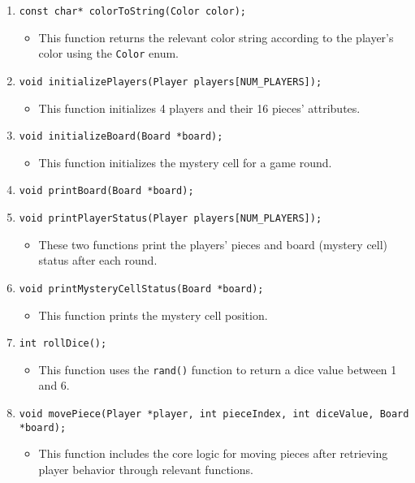 \documentclass[a4paper,12pt]{article}
\begin{document}
\begin{enumerate}
    \item \texttt{const char* colorToString(Color color);}
    \begin{itemize}
        \item This function returns the relevant color string according to the player’s color using the \texttt{Color} enum.
    \end{itemize}

    \item \texttt{void initializePlayers(Player players[NUM\_PLAYERS]);}
    \begin{itemize}
        \item This function initializes 4 players and their 16 pieces' attributes.
    \end{itemize}

    \item \texttt{void initializeBoard(Board *board);}
    \begin{itemize}
        \item This function initializes the mystery cell for a game round.
    \end{itemize}

    \item \texttt{void printBoard(Board *board);}
    \item \texttt{void printPlayerStatus(Player players[NUM\_PLAYERS]);}
    \begin{itemize}
        \item These two functions print the players’ pieces and board (mystery cell) status after each round.
    \end{itemize}

    \item \texttt{void printMysteryCellStatus(Board *board);}
    \begin{itemize}
        \item This function prints the mystery cell position.
    \end{itemize}

    \item \texttt{int rollDice();}
    \begin{itemize}
        \item This function uses the \texttt{rand()} function to return a dice value between 1 and 6.
    \end{itemize}

    \item \texttt{void movePiece(Player *player, int pieceIndex, int diceValue, Board *board);}
    \begin{itemize}
        \item This function includes the core logic for moving pieces after retrieving player behavior through relevant functions.
    \end{itemize}


\end{enumerate}
\end{document}
